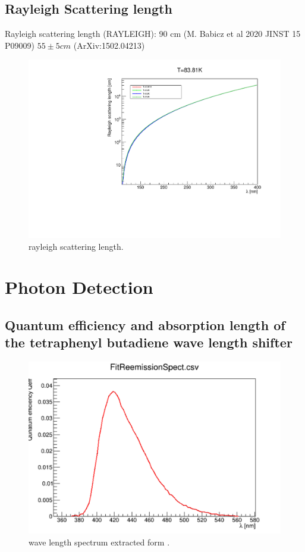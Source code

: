 \documentclass[a4paper]{jpconf}
\begin{document}
  \subsection{Rayleigh Scattering length}
  Rayleigh scattering length (RAYLEIGH): 90 cm (M. Babicz et al 2020 JINST 15 P09009)
  $55\pm  5 cm$ (ArXiv:1502.04213)

  \begin{figure}[ht]
    \begin{center}
      \includegraphics[width=35.5pc]{rayleigh.pdf}
    \end{center}
    \caption{\label{fig:rayleigh}rayleigh scattering length.}
  \end{figure}
  
  \section{Photon Detection}
  
\subsection{Quantum efficiency and absorption length of the tetraphenyl butadiene wave length shifter}
\cite{ref:wls}
\begin{figure}[ht]
\begin{center}
\includegraphics[width=35.5pc]{wls.pdf}
\end{center}
\caption{\label{fig:wls}wave length spectrum extracted form \cite{ref:wls}.}
\end{figure}
\end{document}
